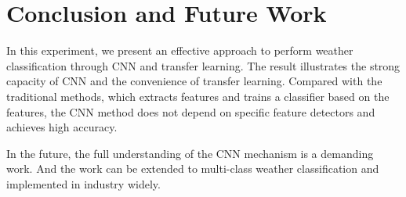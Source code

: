 \section{Conclusion and Future Work}

In this experiment, we present an effective approach to perform weather classification through CNN and transfer learning. The result illustrates the strong capacity of CNN and the convenience of transfer learning. Compared with the traditional methods, which extracts features and trains a classifier based on the features, the CNN method does not depend on specific feature detectors and achieves high accuracy. 

In the future, the full understanding of the CNN mechanism is a demanding work. And the work can be extended to multi-class weather classification and implemented in industry widely.